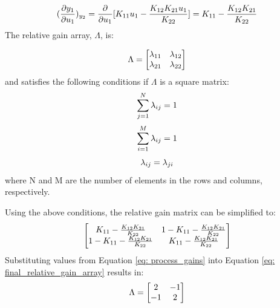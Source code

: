 \begin{equation}
    \centering
        (\frac{\partial y_1}{\partial u_1})_{y_2} = \frac{\partial}{\partial u_1}[K_{11}u_1 - \frac{K_{12}K_{21}u_1}{K_{22}}] = K_{11} - \frac{K_{12}K_{21}}{K_{22}}
\end{equation}
The relative gain array, $\Lambda$, is:

\begin{equation}
    \centering
    \Lambda = 
    \begin{bmatrix}
    \lambda_{11}   &   \lambda_{12}   \\
    \lambda_{21}   &   \lambda_{22}
    \end{bmatrix}
\end{equation}
and satisfies the following conditions if $\Lambda$ is a square matrix:
{
\begin{equation}
    \centering
    \sum_{j = 1}^N \lambda_{ij} = 1
\end{equation}
\begin{equation}
    \centering
    \sum_{i = 1}^M \lambda_{ij} = 1
\end{equation}
\begin{equation}
    \centering
    \lambda_{ij} = \lambda_{ji}
\end{equation}}
where N and M are the number of elements in the rows and columns, respectively.

\noindent
Using the above conditions, the relative gain matrix can be simplified to:
\begin{equation}
    \centering
    \begin{bmatrix}
     K_{11} - \frac{K_{12}K_{21}}{K_{22}}   &   1 - K_{11} - \frac{K_{12}K_{21}}{K_{22}}   \\
     1 - K_{11} - \frac{K_{12}K_{21}}{K_{22}}   &   K_{11} - \frac{K_{12}K_{21}}{K_{22}}
    \end{bmatrix}
    \label{eq: final_relative_gain_array}
\end{equation}
Substituting values from Equation \ref{eq: process_gains} into Equation \ref{eq: final_relative_gain_array} results in:
\begin{equation}
    \centering
    \Lambda = 
    \begin{bmatrix}
     2   &   -1   \\
     -1  &    2
    \end{bmatrix}
    \label{eq: relative_gain_array_w_values}
\end{equation}

